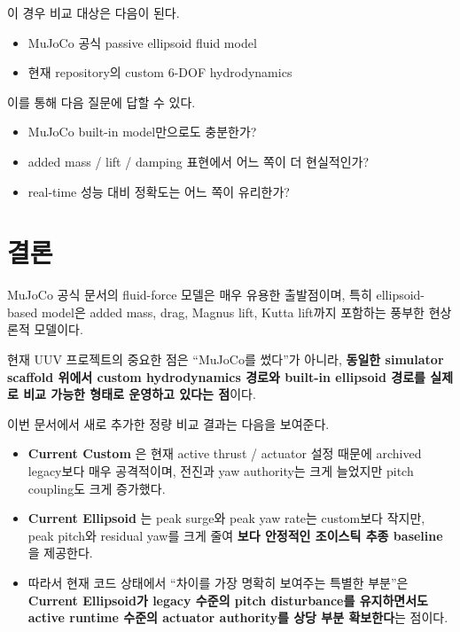 \documentclass[11pt,a4paper]{article}
\begin{document}
이 경우 비교 대상은 다음이 된다.

\begin{itemize}[leftmargin=2em]
  \item MuJoCo 공식 passive ellipsoid fluid model
  \item 현재 repository의 custom 6-DOF hydrodynamics
\end{itemize}

이를 통해 다음 질문에 답할 수 있다.

\begin{itemize}[leftmargin=2em]
  \item MuJoCo built-in model만으로도 충분한가?
  \item added mass / lift / damping 표현에서 어느 쪽이 더 현실적인가?
  \item real-time 성능 대비 정확도는 어느 쪽이 유리한가?
\end{itemize}

\section{결론}

MuJoCo 공식 문서의 fluid-force 모델은 매우 유용한 출발점이며, 특히 ellipsoid-based model은 added mass, drag, Magnus lift, Kutta lift까지 포함하는 풍부한 현상론적 모델이다.

현재 UUV 프로젝트의 중요한 점은 ``MuJoCo를 썼다''가 아니라, \textbf{동일한 simulator scaffold 위에서 custom hydrodynamics 경로와 built-in ellipsoid 경로를 실제로 비교 가능한 형태로 운영하고 있다는 점}이다.

이번 문서에서 새로 추가한 정량 비교 결과는 다음을 보여준다.

\begin{itemize}[leftmargin=2em]
  \item \textbf{Current Custom} 은 현재 active thrust / actuator 설정 때문에 archived legacy보다 매우 공격적이며, 전진과 yaw authority는 크게 늘었지만 pitch coupling도 크게 증가했다.
  \item \textbf{Current Ellipsoid} 는 peak surge와 peak yaw rate는 custom보다 작지만, peak pitch와 residual yaw를 크게 줄여 \textbf{보다 안정적인 조이스틱 추종 baseline}을 제공한다.
  \item 따라서 현재 코드 상태에서 ``차이를 가장 명확히 보여주는 특별한 부분''은 \textbf{Current Ellipsoid가 legacy 수준의 pitch disturbance를 유지하면서도 active runtime 수준의 actuator authority를 상당 부분 확보한다}는 점이다.
\end{itemize}
\end{document}
